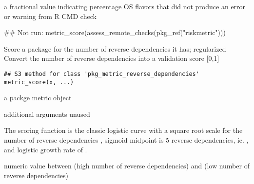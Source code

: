 \documentclass[a4paper]{book}
\begin{document}
%
\begin{Value}
a fractional value indicating percentage OS flavors that did not produce an error or warning from R CMD check
\end{Value}
%
\begin{Examples}
\begin{ExampleCode}
## Not run: metric_score(assess_remote_checks(pkg_ref("riskmetric")))

\end{ExampleCode}
\end{Examples}
%
\begin{Description}
Score a package for the number of reverse dependencies it has; regularized
Convert the number of reverse dependencies  into a validation
score [0,1] 
\end{Description}
%
\begin{Usage}
\begin{verbatim}
## S3 method for class 'pkg_metric_reverse_dependencies'
metric_score(x, ...)
\end{verbatim}
\end{Usage}
%
\begin{Arguments}
\begin{ldescription}
\item[\code{x}] a  packge metric object

\item[\code{...}] additional arguments unused
\end{ldescription}
\end{Arguments}
%
\begin{Details}
The scoring function is the classic logistic curve  with a square root scale for the number of reverse dependencies
, sigmoid midpoint is 5 reverse dependencies, ie. , and logistic growth rate of .

\end{Details}
%
\begin{Value}
numeric value between  (high number of reverse dependencies) and
 (low number of reverse dependencies)
\end{Value}
\end{document}
